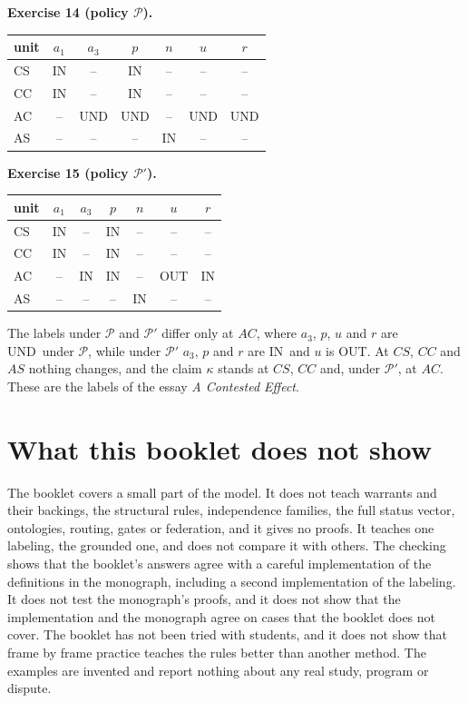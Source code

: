 \documentclass[11pt]{article}
\newcommand{\IN}{\textsf{IN}}
\newcommand{\OUT}{\textsf{OUT}}
\newcommand{\UND}{\textsf{UND}}
\newcounter{fr}
\newcounter{ex}
\newcommand{\Key}[2]{\par\noindent\textbf{#1.}\enspace #2\par}
\begin{document}
\Key{Exercise 14 (policy $\mathcal P$)}{\par\smallskip\noindent \begin{tabular}{@{}lcccccc@{}}\toprule
unit & $a_1$ & $a_3$ & $p$ & $n$ & $u$ & $r$ \\\midrule
CS & \textsf{IN} & -- & \textsf{IN} & -- & -- & -- \\
CC & \textsf{IN} & -- & \textsf{IN} & -- & -- & -- \\
AC & -- & \textsf{UND} & \textsf{UND} & -- & \textsf{UND} & \textsf{UND} \\
AS & -- & -- & -- & \textsf{IN} & -- & -- \\
\bottomrule\end{tabular}}
\Key{Exercise 15 (policy $\mathcal P'$)}{\par\smallskip\noindent \begin{tabular}{@{}lcccccc@{}}\toprule
unit & $a_1$ & $a_3$ & $p$ & $n$ & $u$ & $r$ \\\midrule
CS & \textsf{IN} & -- & \textsf{IN} & -- & -- & -- \\
CC & \textsf{IN} & -- & \textsf{IN} & -- & -- & -- \\
AC & -- & \textsf{IN} & \textsf{IN} & -- & \textsf{OUT} & \textsf{IN} \\
AS & -- & -- & -- & \textsf{IN} & -- & -- \\
\bottomrule\end{tabular}\par\smallskip The labels under $\mathcal P$ and $\mathcal P'$ differ only at $AC$, where $a_3$, $p$, $u$ and $r$ are \UND\ under $\mathcal P$, while under $\mathcal P'$ $a_3$, $p$ and $r$ are \IN\ and $u$ is \OUT. At $CS$, $CC$ and $AS$ nothing changes, and the claim $\kappa$ stands at $CS$, $CC$ and, under $\mathcal P'$, at $AC$. These are the labels of the essay \emph{A Contested Effect}.}

\section{What this booklet does not show}\label{sec:limits}

The booklet covers a small part of the model. It does not teach warrants and their backings, the structural rules, independence families, the full status vector, ontologies, routing, gates or federation, and it gives no proofs. It teaches one labeling, the grounded one, and does not compare it with others. The checking shows that the booklet's answers agree with a careful implementation of the definitions in the monograph, including a second implementation of the labeling. It does not test the monograph's proofs, and it does not show that the implementation and the monograph agree on cases that the booklet does not cover. The booklet has not been tried with students, and it does not show that frame by frame practice teaches the rules better than another method. The examples are invented and report nothing about any real study, program or dispute.
\end{document}
